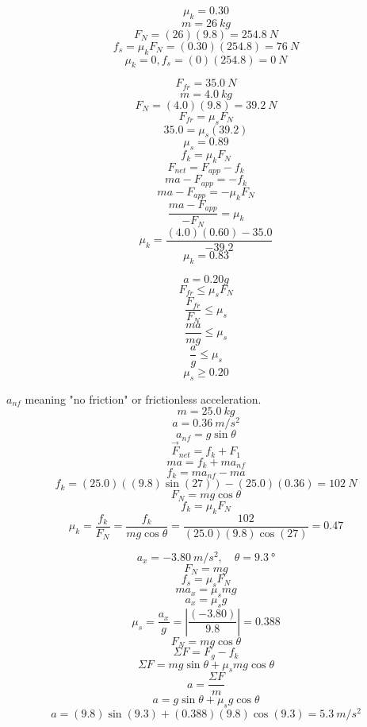 \documentclass[11pt]{homework}
\begin{document}
\maketitle

\renewcommand{\questiontype}{Problem}
\setcounter{questionCounter}{0}

\question
\[
\mu_k = 0.30
\] \[
m=\qty{26}{kg}
\]\[
F_N=(26)(9.8)=\qty{254.8}{N}
\]\[
f_s=\mu_kF_N=(0.30)(254.8)=\boxed{\qty{76}{N}}
\] \[
\mu_k=0, f_s=(0)(254.8)=\boxed{\qty{0}{N}}
\]
\question
\begin{alphaparts}
    \questionpart
    \[
        F_{fr}=\qty{35.0}{N}
        \]\[
        m=\qty{4.0}{kg}
        \] \[
        F_N=(4.0)(9.8)=\qty{39.2}{N}
        \] \[
        F_{fr}=\mu_sF_N
        \] \[
        35.0=\mu_s(39.2)
        \] \[
        \mu_s = \boxed{0.89}
        \] 
    \questionpart
    \[
    f_k = \mu_kF_N
    \] \[
    F_{net} = F_{app} - f_k
    \]\[ 
    ma  - F_{app} = - f_k
    \] \[
    ma - F_{app} = - \mu_kF_N
    \] \[
    \frac{ma-F_{app}}{-F_N}=\mu_k
    \] \[
    \mu_k=\frac{(4.0)(0.60)-35.0}{-39.2}
    \] \[
    \mu_k = \boxed{0.83}
    \] 
\end{alphaparts}

\question
\[
a = 0.20g
\] 
\[
 F_{fr} \le \mu_{s}F_{N}
\] \[
\frac{F_{fr}}{F_N} \le \mu_s
\] \[
\frac{ma}{mg} \le \mu_s
\] \[
\frac{a}{g} \le \mu_s
\] \[
\mu_s \ge \boxed{0.20}
\] 

\setcounter{questionCounter}{5}
\question
$a_{nf}$ meaning "no friction" or frictionless acceleration.
\[
    m = \qty{25.0}{kg}  
\]
\[
    a = \qty{0.36}{m/s^2}
\]
\[
    a_{nf} = g \sin \theta
\]
\[
    \vec{F}_{net} = f_k + F_1
\]
\[
    ma=f_k+ma_{nf}
\]
\[
    f_k = ma_{nf}-ma 
\]
\[
    f_k = (25.0)((9.8)\sin(27))-(25.0)(0.36)= \boxed{\qty{102}{N}}
\]
\[
    F_N = mg\cos\theta
\]
\[
f_k = \mu_kF_N
\]
\[
\mu_k =\frac{f_k}{F_N}= \frac{f_k}{mg\cos\theta} = \frac{102}{(25.0)(9.8)\cos(27)} = \boxed{0.47}
\]

\question
\[
    a_x=\qty{-3.80}{m/s^2}, \quad \theta=\qty{9.3}{\degree}
\]
\[
F_N =mg
\]
\[
f_s=\mu_s F_N
\]
\[
ma_x=\mu_smg
\]
\[
a_x=\mu_sg 
\]
\[
    \mu_s = \frac{a_x}{g} = \left| \frac{(-3.80)}{9.8}\right| = 0.388 
\]
\[
F_N = mg\cos\theta
\]
\[
    \Sigma F = F_g - f_k
\]
\[
    \Sigma F = mg\sin\theta + \mu_s mg \cos\theta
\]
\[
a=\frac{\Sigma F}{m}  
\] 
\[
a=g\sin\theta+\mu_s g \cos\theta
\]
\[
    a=(9.8)\sin(9.3)+(0.388)(9.8)\cos(9.3)=\boxed{\qty{5.3}{m/s^2}}
\]
\end{document}
